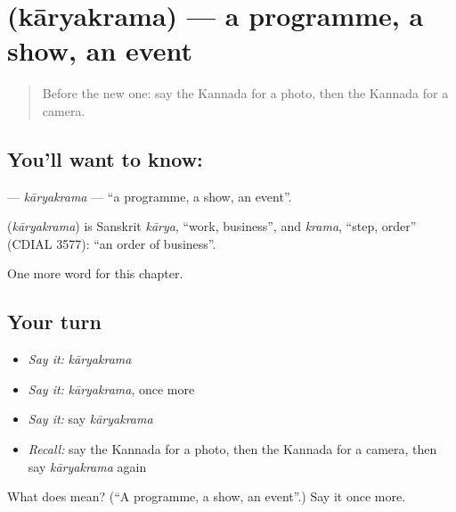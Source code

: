 \section[\texorpdfstring{\kn{ಕಾರ್ಯಕ್ರಮ} (kāryakrama)}{ಕಾರ್ಯಕ್ರಮ (kāryakrama)}]{ (kāryakrama) — a programme, a show, an event}

\label{lesson:KA-C300-karyakrama}



\begin{quote}
Before the new one: say the Kannada for a photo, then the Kannada for a camera.
\end{quote}

\subsection*{You'll want to know: }
\textbf{} — \emph{kāryakrama} — \textquotedblleft{}a programme, a show, an event\textquotedblright{}.

\begin{cousinweb}
\textbf{} (\emph{kāryakrama}) is Sanskrit \emph{kārya}, \textquotedblleft{}work, business\textquotedblright{}, and \emph{krama}, \textquotedblleft{}step, order\textquotedblright{} (CDIAL 3577): \textquotedblleft{}an order of business\textquotedblright{}.
\end{cousinweb}

\begin{grammarlens}[title={What you've built}]
One more word for this chapter.
\end{grammarlens}

\subsection*{Your turn}
\begin{itemize}
\raggedright
  \item \emph{Say it:} \emph{kāryakrama}
  \item \emph{Say it:} \emph{kāryakrama}, once more
  \item \emph{Say it:} say \emph{kāryakrama}
  \item \emph{Recall:} say the Kannada for a photo, then the Kannada for a camera, then say \emph{kāryakrama} again
\end{itemize}

\begin{tcolorbox}[breakable,colback=teal!4,colframe=teal!35!black,title={Before you move on}]
What does  mean? (\textquotedblleft{}A programme, a show, an event\textquotedblright{}.) Say it once more.
\end{tcolorbox}
